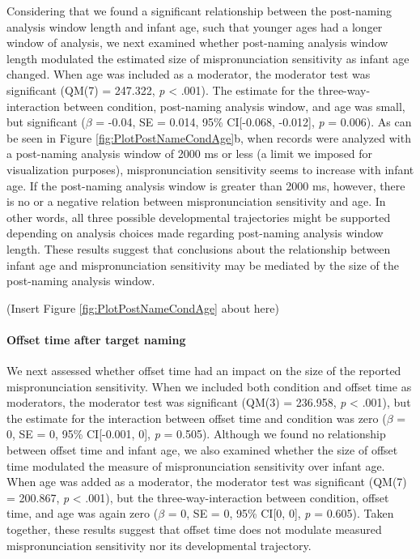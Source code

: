 \documentclass[man]{apa6}
\let\oldparagraph\paragraph
\renewcommand{\paragraph}[1]{\oldparagraph{#1}\mbox{}}
\begin{document}
Considering that we found a significant relationship between the post-naming analysis window length and infant age, such that younger ages had a longer window of analysis, we next examined whether post-naming analysis window length modulated the estimated size of mispronunciation sensitivity as infant age changed. When age was included as a moderator, the moderator test was significant (QM(7) = 247.322, \emph{p} \textless{} .001). The estimate for the three-way-interaction between condition, post-naming analysis window, and age was small, but significant (\(\beta\) = -0.04, SE = 0.014, 95\% CI{[}-0.068, -0.012{]}, \emph{p} = 0.006). As can be seen in Figure \ref{fig:PlotPostNameCondAge}b, when records were analyzed with a post-naming analysis window of 2000 ms or less (a limit we imposed for visualization purposes), mispronunciation sensitivity seems to increase with infant age. If the post-naming analysis window is greater than 2000 ms, however, there is no or a negative relation between mispronunciation sensitivity and age. In other words, all three possible developmental trajectories might be supported depending on analysis choices made regarding post-naming analysis window length. These results suggest that conclusions about the relationship between infant age and mispronunciation sensitivity may be mediated by the size of the post-naming analysis window.

(Insert Figure \ref{fig:PlotPostNameCondAge} about here)

\hypertarget{offset-time-after-target-naming}{%
\paragraph{Offset time after target naming}\label{offset-time-after-target-naming}}

We next assessed whether offset time had an impact on the size of the reported mispronunciation sensitivity. When we included both condition and offset time as moderators, the moderator test was significant (QM(3) = 236.958, \emph{p} \textless{} .001), but the estimate for the interaction between offset time and condition was zero (\(\beta\) = 0, SE = 0, 95\% CI{[}-0.001, 0{]}, \emph{p} = 0.505). Although we found no relationship between offset time and infant age, we also examined whether the size of offset time modulated the measure of mispronunciation sensitivity over infant age. When age was added as a moderator, the moderator test was significant (QM(7) = 200.867, \emph{p} \textless{} .001), but the three-way-interaction between condition, offset time, and age was again zero (\(\beta\) = 0, SE = 0, 95\% CI{[}0, 0{]}, \emph{p} = 0.605). Taken together, these results suggest that offset time does not modulate measured mispronunciation sensitivity nor its developmental trajectory.
\end{document}
